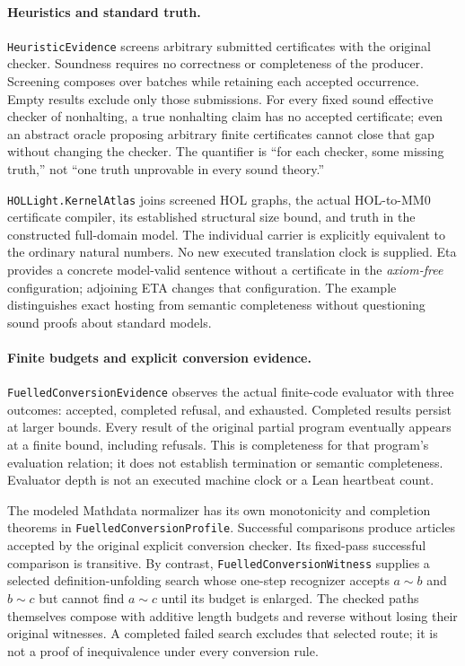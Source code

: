 \documentclass[11pt]{article}
\newcommand{\code}[1]{\nolinkurl{#1}}
\begin{document}
\paragraph{Heuristics and standard truth.}
\code{HeuristicEvidence} screens arbitrary submitted certificates with the
original checker. Soundness requires no correctness or completeness of the
producer. Screening composes over batches while retaining each accepted
occurrence. Empty results exclude only those submissions. For every fixed
sound effective checker of nonhalting, a true nonhalting claim has no
accepted certificate; even an abstract oracle proposing arbitrary finite
certificates cannot close that gap without changing the checker. The
quantifier is ``for each checker, some missing truth,'' not ``one truth
unprovable in every sound theory.''

\code{HOLLight.KernelAtlas} joins screened HOL graphs, the actual HOL-to-MM0
certificate compiler, its established structural size bound, and truth in
the constructed full-domain model. The individual carrier is explicitly
equivalent to the ordinary natural numbers. No new executed translation
clock is supplied. Eta provides a concrete model-valid sentence without a
certificate in the \emph{axiom-free} configuration; adjoining ETA changes
that configuration. The example distinguishes exact hosting from semantic
completeness without questioning sound proofs about standard models.

\paragraph{Finite budgets and explicit conversion evidence.}
\code{FuelledConversionEvidence} observes the actual finite-code evaluator
with three outcomes: accepted, completed refusal, and exhausted. Completed
results persist at larger bounds. Every result of the original partial
program eventually appears at a finite bound, including refusals. This is
completeness for that program's evaluation relation; it does not establish
termination or semantic completeness. Evaluator depth is not an executed
machine clock or a Lean heartbeat count.

The modeled Mathdata normalizer has its own monotonicity and completion
theorems in \code{FuelledConversionProfile}. Successful
comparisons produce articles accepted by the original explicit conversion
checker. Its fixed-pass successful comparison is transitive. By contrast,
\code{FuelledConversionWitness} supplies a selected definition-unfolding
search whose one-step recognizer accepts $a\sim b$ and $b\sim c$ but cannot
find $a\sim c$ until its budget is enlarged. The checked paths themselves
compose with additive length budgets and reverse without losing their
original witnesses. A completed failed search excludes that selected route;
it is not a proof of inequivalence under every conversion rule.
\end{document}
